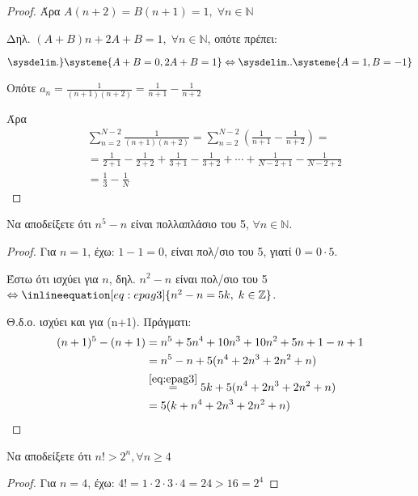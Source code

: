 \documentclass[a4paper,table]{report}
\begin{document}
\begin{multicols}{2}
\begin{enumerate}
\begin{proof}
        Άρα $A(n+2) = B(n+1) = 1, \; \forall n \in \mathbb{N}$

        Δηλ. $ (A+B)n+2A+B=1, \; \forall n \in \mathbb{N} $, οπότε πρέπει:

      $  \sysdelim.\}\systeme{A+B=0,2A+B=1} \Leftrightarrow \sysdelim..
      \systeme{A=1,B=-1} $

      Οπότε $ a_{n} = \frac{1}{(n+1)(n+2)} = \frac{1}{n+1} - \frac{1}{n+2} $

      Άρα 
      \begin{align*}
        &\sum_{n=2}^{N-2} \frac{1}{(n+1)(n+2)} 
        = \sum_{n=2}^{N-2} \left(\frac{1}{n+1} - \frac{1}{n+2}\right) = \\
        &= \frac{1}{2+1} - \frac{1}{2+2} + \frac{1}{3+1} - \frac{1}{3+2} +\cdots +
        \frac{1}{N-2+1} - \frac{1}{N-2+2} \\
        &= \frac{1}{3} - \frac{1}{N} 
      \end{align*}
    \end{proof}

  \item \textcolor{Col1}{Να αποδείξετε ότι $ n^{5} - n $ είναι 
    πολλαπλάσιο του 5, $ \forall n \in \mathbb{N} $.}
    \begin{proof}
      Για $ n=1 $, έχω: $ 1-1=0 $, είναι πολ/σιο του 5, γιατί $0=0\cdot 5$.

      Έστω ότι ισχύει για $n$, δηλ. $n^{2}-n $ 
      είναι πολ/σιο του 5 $
      \Leftrightarrow \inlineequation[eq:epag3]{n^{2}-n=5k, 
      \; k \in \mathbb{Z}} $.

      Θ.δ.ο. ισχύει και για (n+1). Πράγματι:
      \begin{align*}
        (n+1)^{5}-(n+1) &= n^{5}+5n^{4}+10n^{3}+10n^{2}+5n+1-n+1 \\
                        &=n^{5}-n+5(n^{4}+2n^{3}+2n^{2}+n) \\
                        &\overset{\eqref{eq:epag3}}{=} 5k 
                        + 5(n^{4}+2n^{3}+2n^{2}+n) \\ 
                        &= 5(k + n^{4}+2n^{3}+2n^{2}+n)
      \end{align*}
    \end{proof}

  \item \textcolor{Col1}{Να αποδείξετε ότι $ n! > 2^{n}, \forall n \geq 4 $}
    \begin{proof}
    \item {}
      Για $ n=4 $, έχω: $ 4! = 1\cdot 2 \cdot 3 \cdot 4 = 24 > 16 = 2^{4} $


\end{proof}
\end{enumerate}
\end{multicols}
\end{document}

